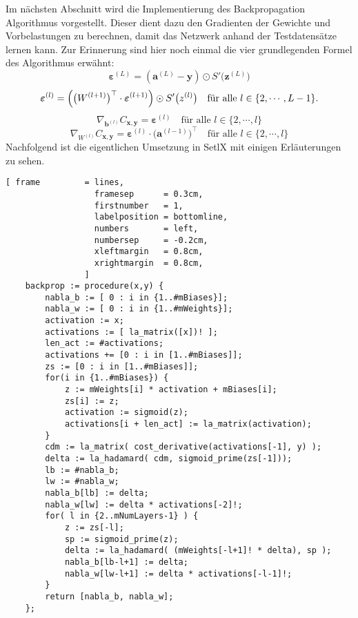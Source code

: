 \noindent
Im nächsten Abschnitt wird die Implementierung des Backpropagation Algorithmus vorgestellt. Dieser dient dazu den Gradienten der Gewichte und Vorbelastungen zu berechnen, damit das Netzwerk anhand der Testdatensätze lernen kann. Zur Erinnerung sind hier noch einmal die vier grundlegenden Formel des Algorithmus erwähnt:
\begin{equation} \label{eq:BP1_impl}
	\boldsymbol{\varepsilon}^{(L)} = (\mathbf{a}^{(L)} - \mathbf{y}) \odot S'\bigl(\mathbf{z}^{(L)}\bigr)  
\end{equation}
\begin{equation} \label{eq:BP2_impl}
	\boldsymbol{\varepsilon}^{(l)} = \Bigl(\bigl(W^{(l+1)}\bigr)^\top \cdot \boldsymbol{\varepsilon}^{(l+1)}\Bigr) \odot
  S'\bigl(z^{(l)}\bigr) \quad \mbox{für alle $l \in \{2, \cdots, L-1\}$}.
\end{equation}
\begin{equation} \label{eq:BP3_impl}
	\nabla_{\mathbf{b}^{(l)}} C_{\mathbf{x}, \mathbf{y}} = \boldsymbol{\varepsilon}^{(l)}
  \quad \mbox{für alle $l \in \{2, \cdots,l\}$}
\end{equation}
\begin{equation} \label{eq:BP4_impl}
	\nabla_{W^{(l)}} C_{\mathbf{x}, \mathbf{y}} = \boldsymbol{\varepsilon}^{(l)} \cdot \bigl(\mathbf{a}^{(l-1)}\bigr)^\top
  \quad \mbox{für alle $l \in \{2, \cdots,l\}$}
\end{equation}
Nachfolgend ist die eigentlichen Umsetzung in SetlX mit einigen Erläuterungen zu sehen.
\begin{Verbatim}[ frame         = lines, 
                  framesep      = 0.3cm, 
                  firstnumber   = 1,
                  labelposition = bottomline,
                  numbers       = left,
                  numbersep     = -0.2cm,
                  xleftmargin   = 0.8cm,
                  xrightmargin  = 0.8cm,
                ]
    backprop := procedure(x,y) {
        nabla_b := [ 0 : i in {1..#mBiases}];
        nabla_w := [ 0 : i in {1..#mWeights}];
        activation := x;
        activations := [ la_matrix([x])! ];
        len_act := #activations;
        activations += [0 : i in [1..#mBiases]];
        zs := [0 : i in [1..#mBiases]];		
        for(i in {1..#mBiases}) {
            z := mWeights[i] * activation + mBiases[i];
            zs[i] := z;	
            activation := sigmoid(z);
            activations[i + len_act] := la_matrix(activation);
        }
        cdm := la_matrix( cost_derivative(activations[-1], y) );
        delta := la_hadamard( cdm, sigmoid_prime(zs[-1]));
        lb := #nabla_b;
        lw := #nabla_w;
        nabla_b[lb] := delta;	
        nabla_w[lw] := delta * activations[-2]!;				
        for( l in {2..mNumLayers-1} ) {
            z := zs[-l];
            sp := sigmoid_prime(z);	
            delta := la_hadamard( (mWeights[-l+1]! * delta), sp );
            nabla_b[lb-l+1] := delta;
            nabla_w[lw-l+1] := delta * activations[-l-1]!;
        }
        return [nabla_b, nabla_w];
    };
\end{Verbatim}
